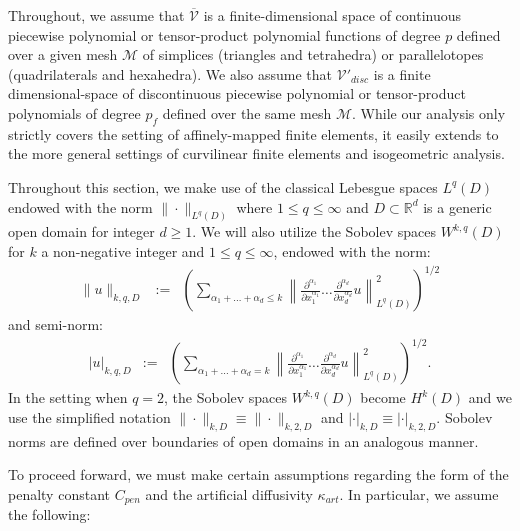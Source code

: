 \documentclass[11pt]{article}
\begin{document}
Throughout, we assume that $\overline{\mathcal{V}}$ is a finite-dimensional space of continuous piecewise polynomial or tensor-product polynomial functions of degree $p$ defined over a given mesh $\mathcal{M}$ of simplices (triangles and tetrahedra) or parallelotopes (quadrilaterals and hexahedra).  We also assume that $\mathcal{V}'_{disc}$ is a finite dimensional-space of discontinuous piecewise polynomial or tensor-product polynomials of degree $p_f$ defined over the same mesh $\mathcal{M}$.  While our analysis only strictly covers the setting of affinely-mapped finite elements, it easily extends to the more general settings of curvilinear finite elements and isogeometric analysis.

Throughout this section, we make use of the classical Lebesgue spaces $L^q(D)$ endowed with the norm $\| \cdot \|_{L^q(D)}$ where $1 \leq q \leq \infty$ and $D \subset \mathbb{R}^d$ is a generic open domain for integer $d \geq 1$.  We will also utilize the Sobolev spaces $W^{k,q}(D)$ for $k$ a non-negative integer and $1 \leq q \leq \infty$, endowed with the norm:
\begin{equation}
\begin{aligned}
\| u \|_{k,q,D} &:=& \left( \sum_{\alpha_1 + \ldots + \alpha_d \leq k} \left\| \frac{\partial^{\alpha_1}}{\partial x^{\alpha_1}_1} \ldots \frac{\partial^{\alpha_d}}{\partial x^{\alpha_d}_d} u \right\|^2_{L^q(D)} \right)^{1/2}
\end{aligned}
\end{equation}
and semi-norm:
\begin{equation}
\begin{aligned}
| u |_{k,q,D} &:=& \left( \sum_{\alpha_1 + \ldots + \alpha_d = k} \left\| \frac{\partial^{\alpha_1}}{\partial x^{\alpha_1}_1} \ldots \frac{\partial^{\alpha_d}}{\partial x^{\alpha_d}_d} u \right\|^2_{L^q(D)} \right)^{1/2}.
\end{aligned}
\end{equation}
In the setting when $q = 2$, the Sobolev spaces $W^{k,q}(D)$ become $H^k(D)$ and we use the simplified notation $\| \cdot \|_{k,D} \equiv \| \cdot \|_{k,2,D}$ and $| \cdot |_{k,D} \equiv | \cdot |_{k,2,D}$.  Sobolev norms are defined over boundaries of open domains in an analogous manner.

To proceed forward, we must make certain assumptions regarding the form of the penalty constant $C_{pen}$ and the artificial diffusivity $\kappa_{art}$.  In particular, we assume the following:\\
\end{document}
